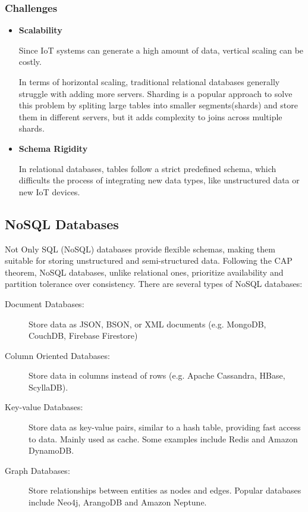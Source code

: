 \subsubsection{Challenges}
\begin{itemize}

	\item \textbf{Scalability}

	      Since IoT systems can generate a high amount of data, vertical scaling can
	      be costly.

	      In terms of horizontal scaling, traditional relational databases generally
	      struggle with adding more servers. Sharding is a popular approach to
	      solve this problem by spliting large tables into smaller segments(shards)
	      and store them in different servers, but it adds complexity to joins
	      across multiple shards.

	\item \textbf{Schema Rigidity}

	      In relational databases, tables follow a strict predefined schema, which
	      difficults the process of integrating new data types, like unstructured
	      data or new IoT devices.

\end{itemize}


\subsection{NoSQL Databases}
Not Only SQL (NoSQL) databases provide flexible schemas, making them suitable
for storing unstructured and semi-structured data. Following the CAP theorem,
NoSQL databases, unlike relational ones, prioritize availability and partition
tolerance over consistency. There are several types of NoSQL databases:

\begin{description}

	\item[Document Databases: ]Store data as JSON, BSON, or XML documents (e.g.
	      MongoDB, CouchDB, Firebase Firestore)
	\item[Column Oriented Databases: ]Store data in columns instead of rows (e.g.
	      Apache Cassandra, HBase, ScyllaDB).
	\item[Key-value Databases: ]Store data as key-value pairs, similar to
	      a hash table, providing fast access to data. Mainly used as cache. Some
	      examples include Redis and Amazon DynamoDB.
	\item[Graph Databases: ]Store relationships between entities as nodes and
	      edges. Popular databases include Neo4j, ArangoDB and Amazon Neptune.

\end{description}


